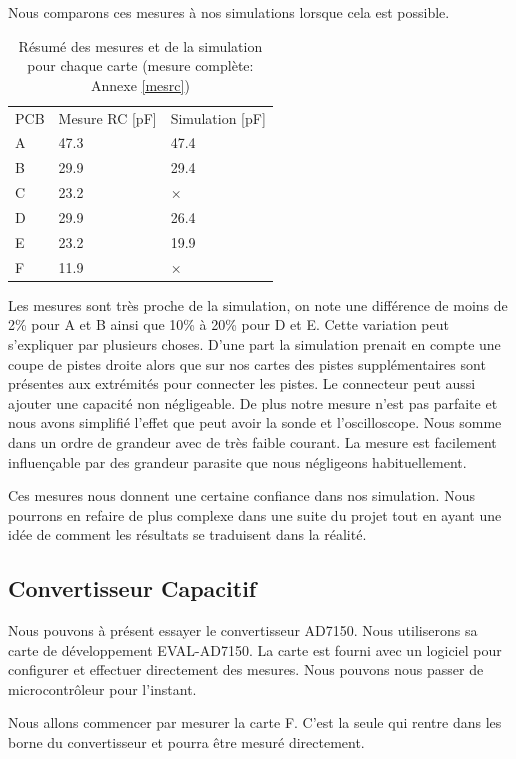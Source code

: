 Nous comparons ces mesures à nos simulations lorsque cela est possible. 

\begin{table}[!ht]
\begin{center}
\begin{tabular}[c]{lll}
PCB & Mesure RC [pF] & Simulation [pF]\\
A & 47.3 & 47.4\\
B & 29.9 & 29.4\\
C & 23.2 & ×\\
D & 29.9 & 26.4\\
E & 23.2 & 19.9\\
F & 11.9 & ×
\end{tabular}
\caption{Résumé des mesures et de la simulation pour chaque carte (mesure complète: Annexe \ref{mesrc})}
\end{center}
\end{table}


Les mesures sont très proche de la simulation, on note une différence de moins de 2\% pour A et B ainsi que 10\% à 20\% pour D et E. Cette variation peut s'expliquer par plusieurs choses. D'une part la simulation prenait en compte une coupe de pistes droite alors que sur nos cartes des pistes supplémentaires sont présentes aux extrémités pour connecter les pistes. Le connecteur peut aussi ajouter une capacité non négligeable. De plus notre mesure n'est pas parfaite et nous avons simplifié l'effet que peut avoir la sonde et l'oscilloscope. Nous somme dans un ordre de grandeur avec de très faible courant. La mesure est facilement influençable par des grandeur parasite que nous négligeons habituellement. 

Ces mesures nous donnent une certaine confiance dans nos simulation. Nous pourrons en refaire de plus complexe dans une suite du projet tout en ayant une idée de comment les résultats se traduisent dans la réalité.  


\subsection{Convertisseur Capacitif}

Nous pouvons à présent essayer le convertisseur AD7150. Nous utiliserons sa carte de développement EVAL-AD7150. La carte est fourni avec un logiciel pour configurer et effectuer directement des mesures. Nous pouvons nous passer de microcontrôleur pour l'instant.

Nous allons commencer par mesurer la carte F. C'est la seule qui rentre dans les borne du convertisseur et pourra être mesuré directement. 

